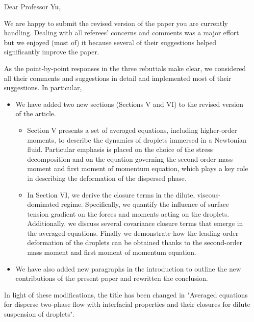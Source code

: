 \documentclass[10pt,a4paper]{letter}
\begin{document}
\begin{letter}{}%
\opening{Dear Professor Yu,}

We are happy to submit the revised version of the paper you are currently handling. 
Dealing with all referees' concerns and comments was a major effort but we enjoyed (most of) it because several of their suggestions helped significantly improve the paper. 

As the point-by-point responses in the three rebuttals make clear, we considered all their comments and suggestions in detail and implemented most of their suggestions. 
In particular,

\begin{itemize}
\item We have added two new sections (Sections V and VI) to the revised version of the article.
\begin{itemize}
\item Section V presents a set of averaged equations, including higher-order moments, to describe the dynamics of droplets immersed in a Newtonian fluid. 
Particular emphasis is placed on the choice of the stress decomposition and on the equation governing the second-order mass moment and first moment of momentum equation, which plays a key role in describing the deformation of the dispersed phase.
\item In Section VI, we derive the closure terms in the dilute, viscous-dominated regime. 
Specifically, we quantify the influence of surface tension gradient on the forces and moments acting on the droplets. 
Additionally, we discuss several covariance closure terms that emerge in the averaged equations.
Finally we demonstrate how the leading order deformation of the droplets can be obtained thanks to the second-order mass moment and first moment of momentum equation.
\end{itemize}
\item We have also added new paragraphs in the introduction to outline the new contributions of the present paper and rewritten the conclusion.
\end{itemize}
In light of these modifications, the title has been changed in "Averaged equations for disperse two-phase flow with interfacial properties and their closures for dilute suspension of droplets".


\end{letter}
\end{document}
